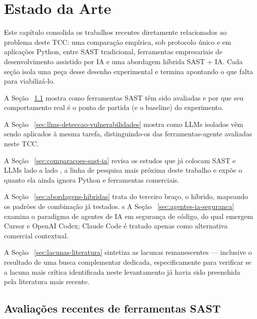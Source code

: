 \chapter{Estado da Arte}\label{cap:estadoarte}

Este capítulo consolida os trabalhos recentes diretamente relacionados ao problema deste TCC: uma comparação empírica, sob protocolo único e em aplicações Python, entre SAST tradicional, ferramentas empresariais de desenvolvimento assistido por IA e uma abordagem híbrida SAST + IA. Cada seção isola uma peça desse desenho experimental e termina apontando o que falta para viabilizá-lo. 

A Seção ~\ref{sec:avaliacoes-sast} mostra como ferramentas SAST têm sido avaliadas e por que seu comportamento real é o ponto de partida (e o baseline) do experimento. 

A Seção ~\ref{sec:llms-deteccao-vulnerabilidades} mostra como LLMs isolados vêm sendo aplicados à mesma tarefa, distinguindo-os das ferramentas-agente avaliadas neste TCC. 

A Seção ~\ref{sec:comparacoes-sast-ia} revisa os estudos que já colocam SAST e LLMs lado a lado , a linha de pesquisa mais próxima deste trabalho  e expõe o quanto ela ainda ignora Python e ferramentas comerciais. 

A Seção ~\ref{sec:abordagens-hibridas}  trata do terceiro braço, o híbrido, mapeando os padrões de combinação já testados. 
s
A Seção ~\ref{sec:agentes-ia-seguranca} examina o paradigma de agentes de IA em segurança de código, do qual emergem Cursor e OpenAI Codex; Claude Code é tratado apenas como alternativa comercial contextual. 

A Seção ~\ref{sec:lacunas-literatura} sintetiza as lacunas remanescentes — inclusive o resultado de uma busca complementar dedicada, especificamente para verificar se a lacuna mais crítica identificada neste levantamento já havia sido preenchida pela literatura mais recente.


\section{Avaliações recentes de ferramentas SAST}\label{sec:avaliacoes-sast}

